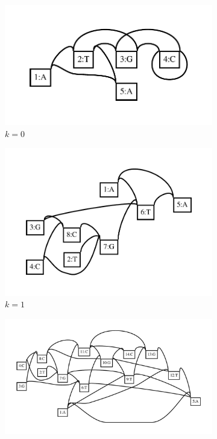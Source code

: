 \begin{figure}[htbp!] 
  \centering
  \begin{subfigure}[t]{0.49\textwidth}
    \includegraphics[width=1.0\textwidth]{Chapter2/Figs/loopy_dagify0.pdf}
    \caption{$k=0$} \label{subfig:dagify_k0}
  \end{subfigure}
  \begin{subfigure}[t]{0.49\textwidth}
    \includegraphics[width=1.0\textwidth]{Chapter2/Figs/loopy_dagify1.pdf}
    \caption{$k=1$} \label{subfig:dagify_k1}
  \end{subfigure}
  \begin{subfigure}[t]{0.49\textwidth}
    \includegraphics[width=1.0\textwidth]{Chapter2/Figs/loopy_dagify4.pdf}

\end{subfigure}
\end{figure}
